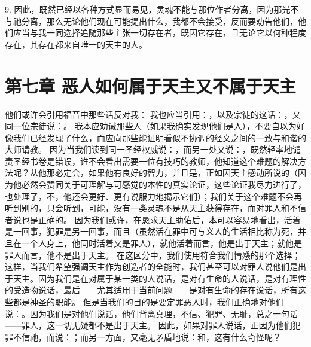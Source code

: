 9. 因此，既然已经以各种方式显而易见，灵魂不能与那位作者分离，因为那光不与祂分离，那么无论他们现在可能提出什么，我都不会接受，反而要劝告他们，他们应当与我一同选择追随那些主张一切存在者，既因它存在，且无论它以何种程度存在，其存在都来自唯一的天主的人。\par


\section{第七章 恶人如何属于天主又不属于天主}

他们或许会引用福音中那些话反对我：  我也应当引用：，以及宗徒的这话：，又同一位宗徒说：。 我本应劝诫那些人（如果我确实发现他们是人），不要自以为好像我们已经发现了什么，而应向那些能证明看似不协调的经文之间的一致与和谐的大师请教。 因为当我们读到同一圣经权威说：，而另一处又说：，既然轻率地谴责圣经书卷是错误，谁不会看出需要一位有技巧的教师，他知道这个难题的解决方法呢？从他那必定会，如果他有良好的智力，并且是，正如因天主感动所说的（因为他必然会赞同关于可理解与可感觉的本性的真实论证，这些论证我尽力进行了，也处理了，不，他还会更好、更有说服力地揭示它们）；我们关于这个难题不会再听到别的，只会听到，可能，没有一类灵魂不是从天主获得存在，而对罪人和不信者说也是正确的。 因为我们或许，在恳求天主助佑后，本可以容易地看出，活着是一回事，犯罪是另一回事，而且（虽然活在罪中可与义人的生活相比称为死，并且在一个人身上，他同时活着又是罪人），就他活着而言，他是出于天主；就他是罪人而言，他不是出于天主。 在这区分中，我们使用符合我们情感的那个选择；这样，当我们希望强调天主作为创造者的全能时，我们甚至可以对罪人说他们是出于天主。因为我们是在对属于某一类的人说话，是对有生命的人说话，是对有理性的受造物说话，最后——尤其适用于当前问题——是对有生命的存在说话，所有这些都是神圣的职能。 但是当我们的目的是要定罪恶人时，我们正确地对他们说：。因为我们是对他们说话，他们背离真理，不信、犯罪、无耻，总之一句话——罪人，这一切无疑都不是出于天主。 因此，如果对罪人说话，正因为他们犯罪不信祂，而说：；而另一方面，又毫无矛盾地说：和，这有什么奇怪呢？ 